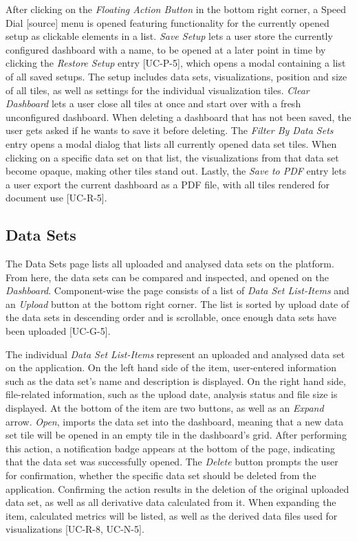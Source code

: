 After clicking on the \emph{Floating Action Button} in the bottom right corner, a Speed Dial [source] menu is opened featuring functionality for the currently opened setup as clickable elements in a list.
\emph{Save Setup} lets a user store the currently configured dashboard with a name, to be opened at a later point in time by clicking the \emph{Restore Setup} entry [UC-P-5], which opens a modal containing a list of all saved setups. The setup includes data sets, visualizations, position and size of all tiles, as well as settings for the individual visualization tiles. \emph{Clear Dashboard} lets a user close all tiles at once and start over with a fresh unconfigured dashboard. When deleting a dashboard that has not been saved, the user gets asked if he wants to save it before deleting. The \emph{Filter By Data Sets} entry opens a modal dialog that lists all currently opened data set tiles. When clicking on a specific data set on that list, the visualizations from that data set become opaque, making other tiles stand out. Lastly, the \emph{Save to PDF} entry lets a user export the current dashboard as a PDF file, with all tiles rendered for document use [UC-R-5].

\subsection{Data Sets}
The Data Sets page lists all uploaded and analysed data sets on the platform. From here, the data sets can be compared and inspected, and opened on the \emph{Dashboard}. Component-wise the page consists of a list of \emph{Data Set List-Items} and an \emph{Upload} button at the bottom right corner. The list is sorted by upload date of the data sets in descending order and is scrollable, once enough data sets have been uploaded [UC-G-5].

The individual \emph{Data Set List-Items} represent an uploaded and analysed data set on the application. On the left hand side of the item, user-entered information such as the data set's name and description is displayed. On the right hand side, file-related information, such as the upload date, analysis status and file size is displayed. At the bottom of the item are two buttons, as well as an \emph{Expand} arrow. \emph{Open}, imports the data set into the dashboard, meaning that a new data set tile will be opened in an empty tile in the dashboard's grid. After performing this action, a notification badge appears at the bottom of the page, indicating that the data set was successfully opened. The \emph{Delete} button prompts the user for confirmation, whether the specific data set should be deleted from the application. Confirming the action results in the deletion of the original uploaded data set, as well as all derivative data calculated from it. When expanding the item, calculated metrics will be listed, as well as the derived data files used for visualizations [UC-R-8, UC-N-5].

